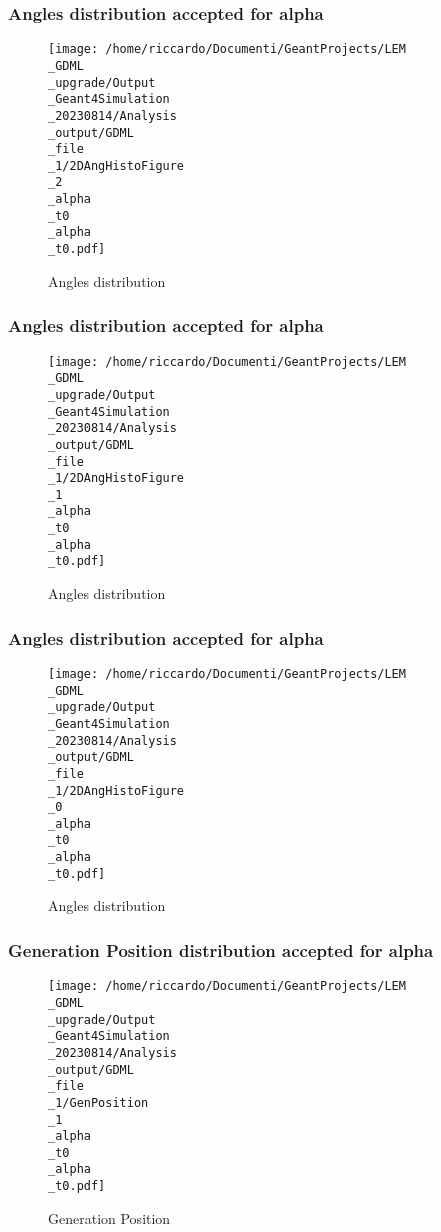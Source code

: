 \documentclass[8pt]{beamer}
\begin{document}
            \begin{frame}
                \frametitle{Angles distribution accepted for alpha}
            
        \begin{figure}[h]
            \centering
            \texttt{[image: /home/riccardo/Documenti/GeantProjects/LEM\\\_GDML\\\_upgrade/Output\\\_Geant4Simulation\\\_20230814/Analysis\\\_output/GDML\\\_file\\\_1/2DAngHistoFigure\\\_2\\\_alpha\\\_t0\\\_alpha\\\_t0.pdf]}
            \caption{Angles distribution}
        \end{figure}
        
            \end{frame}
            
            \begin{frame}
                \frametitle{Angles distribution accepted for alpha}
            
        \begin{figure}[h]
            \centering
            \texttt{[image: /home/riccardo/Documenti/GeantProjects/LEM\\\_GDML\\\_upgrade/Output\\\_Geant4Simulation\\\_20230814/Analysis\\\_output/GDML\\\_file\\\_1/2DAngHistoFigure\\\_1\\\_alpha\\\_t0\\\_alpha\\\_t0.pdf]}
            \caption{Angles distribution}
        \end{figure}
        
            \end{frame}
            
            \begin{frame}
                \frametitle{Angles distribution accepted for alpha}
            
        \begin{figure}[h]
            \centering
            \texttt{[image: /home/riccardo/Documenti/GeantProjects/LEM\\\_GDML\\\_upgrade/Output\\\_Geant4Simulation\\\_20230814/Analysis\\\_output/GDML\\\_file\\\_1/2DAngHistoFigure\\\_0\\\_alpha\\\_t0\\\_alpha\\\_t0.pdf]}
            \caption{Angles distribution}
        \end{figure}
        
            \end{frame}
            
            \begin{frame}
                \frametitle{Generation Position distribution accepted for alpha}
            
        \begin{figure}[h]
            \centering
            \texttt{[image: /home/riccardo/Documenti/GeantProjects/LEM\\\_GDML\\\_upgrade/Output\\\_Geant4Simulation\\\_20230814/Analysis\\\_output/GDML\\\_file\\\_1/GenPosition\\\_1\\\_alpha\\\_t0\\\_alpha\\\_t0.pdf]}
            \caption{Generation Position}
        \end{figure}
        
            \end{frame}
            
\end{document}
